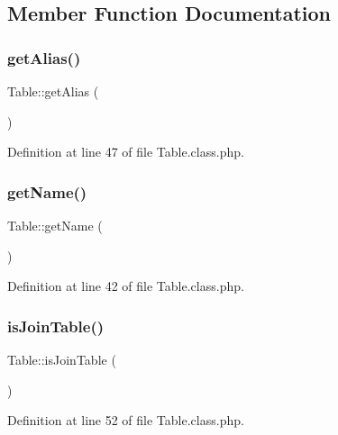 \subsection{Member Function Documentation}
\hypertarget{classTable_ad278f4d13845b8b52a4496f6c5f0e47d}{}\label{classTable_ad278f4d13845b8b52a4496f6c5f0e47d} 
\subsubsection{\texorpdfstring{get\+Alias()}{getAlias()}}
{\footnotesize\ttfamily Table\+::get\+Alias (\begin{DoxyParamCaption}{ }\end{DoxyParamCaption})}



Definition at line 47 of file Table.\+class.\+php.

\hypertarget{classTable_a8e2ad8a066449c8fedf8f3a9192db355}{}\label{classTable_a8e2ad8a066449c8fedf8f3a9192db355} 
\subsubsection{\texorpdfstring{get\+Name()}{getName()}}
{\footnotesize\ttfamily Table\+::get\+Name (\begin{DoxyParamCaption}{ }\end{DoxyParamCaption})}



Definition at line 42 of file Table.\+class.\+php.

\hypertarget{classTable_a4d82b6895fe7a4af2ff50dddc955d075}{}\label{classTable_a4d82b6895fe7a4af2ff50dddc955d075} 
\subsubsection{\texorpdfstring{is\+Join\+Table()}{isJoinTable()}}
{\footnotesize\ttfamily Table\+::is\+Join\+Table (\begin{DoxyParamCaption}{ }\end{DoxyParamCaption})}



Definition at line 52 of file Table.\+class.\+php.

\hypertarget{classTable_ab93dfd4a90901959b57787798162b318}{}\label{classTable_ab93dfd4a90901959b57787798162b318} 
